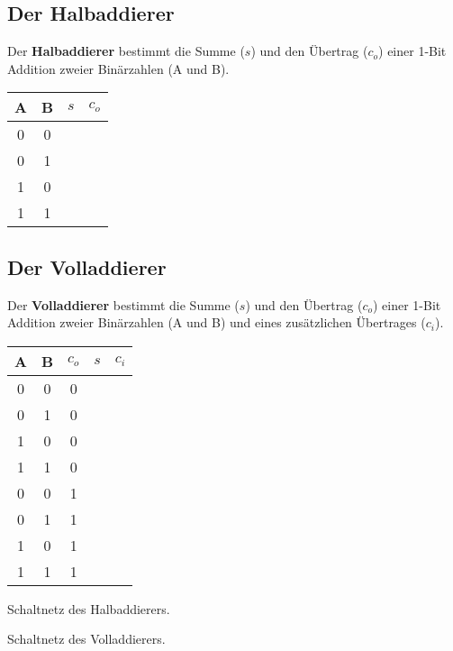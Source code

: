 \documentclass[10pt, a4paper]{arbeitsblatt}
\begin{document}
\ReiheTitel

\begin{multicols}{2}
\subsection*{Der Halbaddierer}

Der \textbf{Halbaddierer} bestimmt die Summe ($s$) und den Übertrag ($c_o$) einer 1-Bit Addition zweier Binärzahlen (A und B).

\begin{center}
\begin{tabular}{c|c|c|c}\texttt\small
	A & B & $s$ & $c_o$\\\hline
	0 & 0 & & \\
	0 & 1 & & \\
	1 & 0 & & \\
	1 & 1 & & \\
\end{tabular}
\end{center}

\vspace*{2cm}

\columnbreak

\subsection*{Der Volladdierer}

Der \textbf{Volladdierer} bestimmt die Summe ($s$) und den Übertrag ($c_o$) einer 1-Bit Addition zweier Binärzahlen (A und B) und eines zusätzlichen Übertrages ($c_i$).

\begin{center}
\begin{tabular}{c|c|c|c|c}\texttt\small
	A & B & $c_o$ & $s$ & $c_i$\\\hline
	0 & 0 & 0 & & \\
	0 & 1 & 0 & & \\
	1 & 0 & 0 & & \\
	1 & 1 & 0 & & \\
	0 & 0 & 1 & & \\
	0 & 1 & 1 & & \\
	1 & 0 & 1 & & \\
	1 & 1 & 1 & & \\
\end{tabular}
\end{center}
\end{multicols}

\begin{rahmen}\centering
Schaltnetz des Halbaddierers.
\vspace{4.5cm}
\end{rahmen}
\begin{rahmen}\centering
Schaltnetz des Volladdierers.
\vspace{4.5cm}
\end{rahmen}
\end{document}
